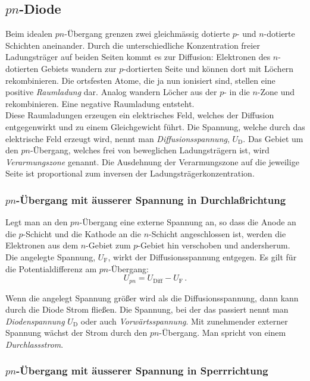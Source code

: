 \subsection{$pn$-Diode}

Beim idealen $pn$-\"Ubergang grenzen zwei gleichm\"assig dotierte $p$-
und $n$-dotierte Schichten aneinander. Durch die unterschiedliche
Konzentration freier Ladungstr\"ager auf beiden Seiten kommt es zur
Diffusion: Elektronen des $n$-dotierten Gebiets wandern zur
$p$-dortierten Seite und k\"onnen dort mit L\"ochern rekombinieren. Die 
ortsfesten Atome, die ja nun ionisiert sind, stellen eine
positive {\it Raumladung} dar. Analog wandern L\"ocher aus der
$p$- in die $n$-Zone und rekombinieren. Eine negative Raumladung
entsteht.\\
Diese Raumladungen erzeugen ein elektrisches Feld,
welches der Diffusion entgegenwirkt und zu einem Gleichgewicht
f\"uhrt. Die Spannung, welche durch das elektrische Feld erzeugt
wird, nennt man {\it Diffusionsspannung}, $U_{\mathrm{D}}$. Das Gebiet
um den $pn$-\"Ubergang, welches frei von beweglichen Ladungstr{\"a}gern
 ist, wird {\it Verarmungszone} genannt. 
Die Ausdehnung der Verarmungszone auf die
jeweilige Seite ist proportional zum inversen der
Ladungstr\"agerkonzentration.

\subsubsection{$pn$-\"Ubergang mit \"ausserer Spannung in Durchlaßrichtung}

Legt man an den $pn$-\"Ubergang eine externe Spannung an, so dass die
Anode an die $p$-Schicht und die Kathode an die $n$-Schicht
angeschlossen ist, werden die Elektronen aus dem $n$-Gebiet zum
$p$-Gebiet hin verschoben und andersherum. Die angelegte Spannung,
$U_{\mathrm{F}}$, wirkt der Diffusionsspannung entgegen. Es gilt f\"ur
die Potentialdifferenz am $pn$-\"Ubergang:
%
\begin{equation}
U_{pn} = U_{\mathrm{Diff}} - U_{\mathrm{F}} \, .
\end{equation}

\noindent
Wenn die angelegt Spannung größer wird als die Diffusionsspannung, dann kann durch die Diode Strom fließen. Die Spannung, bei der das passiert nennt man \textit{Diodenspannung} $U_{\mathrm{D}}$ oder auch \textit{Vorwärtsspannung}. Mit zunehmender externer Spannung w\"achst der Strom durch den
$pn$-\"Ubergang. Man spricht von einem {\it Durchlassstrom}.

\subsubsection{$pn$-\"Ubergang mit \"ausserer Spannung in Sperrrichtung}

